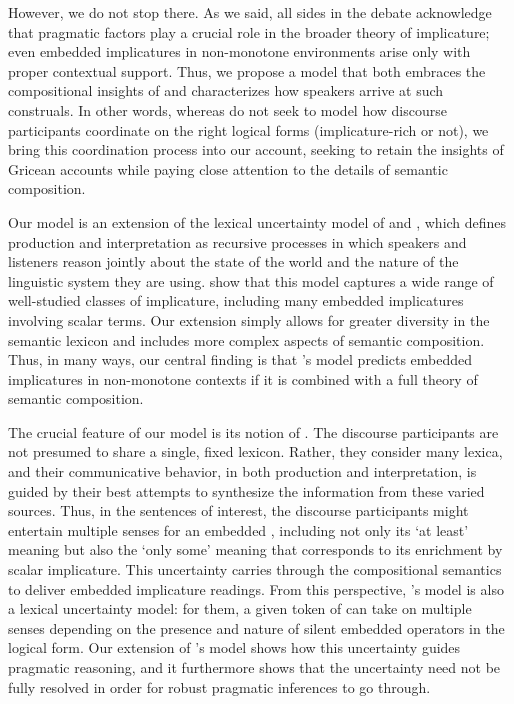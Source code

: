 \documentclass[leqno]{article}
\begin{document}
However, we do not stop there. As we said, all sides in the debate
acknowledge that pragmatic factors play a crucial role in the broader
theory of implicature; even embedded implicatures in non-monotone
environments arise only with proper contextual support. Thus, we
propose a model that both embraces the compositional insights of
\citeauthor{ChierchiaFoxSpector08} and characterizes how speakers
arrive at such construals. In other words, whereas
\citeauthor{ChierchiaFoxSpector08} do not seek to model how discourse
participants coordinate on the right logical forms (implicature-rich
or not), we bring this coordination process into our account, seeking
to retain the insights of Gricean accounts while paying close
attention to the details of semantic composition.


Our model is an extension of the lexical uncertainty model of
\citet{Bergen:Goodman:Levy:2012} and \citet{Bergen:Levy:Goodman:2014},
which defines production and interpretation as recursive processes in
which speakers and listeners reason jointly about the state of the
world and the nature of the linguistic system they are
using. \citeauthor{Bergen:Levy:Goodman:2014} show that this model
captures a wide range of well-studied classes of implicature,
including many embedded implicatures involving scalar terms. Our
extension simply allows for greater diversity in the semantic lexicon
and includes more complex aspects of semantic composition. Thus, in
many ways, our central finding is that
\citeauthor{Bergen:Levy:Goodman:2014}'s model predicts embedded
implicatures in non-monotone contexts if it is combined with a full
theory of semantic composition.


The crucial feature of our model is its notion of . The discourse participants are not presumed to share a
single, fixed lexicon. Rather, they consider many lexica, and their
communicative behavior, in both production and interpretation, is
guided by their best attempts to synthesize the information from these
varied sources. Thus, in the sentences of interest, the discourse
participants might entertain multiple senses for an embedded
, including not only its `at least' meaning but also the
`only some' meaning that corresponds to its enrichment by scalar
implicature. This uncertainty carries through the compositional
semantics to deliver embedded implicature readings. From this
perspective, \citeauthor{ChierchiaFoxSpector08}'s model is also a
lexical uncertainty model: for them, a given token of  can
take on multiple senses depending on the presence and nature of silent
embedded operators in the logical form. Our extension of
\citeauthor{Bergen:Levy:Goodman:2014}'s model shows how this
uncertainty guides pragmatic reasoning, and it furthermore shows that
the uncertainty need not be fully resolved in order for robust
pragmatic inferences to go through.
\end{document}
